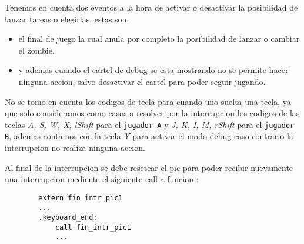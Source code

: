 	Tenemos en cuenta dos eventos a la hora de activar o desactivar la posibilidad de lanzar tareas o elegirlas, estas son: 
	\begin{itemize}
		\item{el final de juego la cual anula por completo la posibilidad de lanzar o cambiar el zombie.}

		\item{y ademas cuando el cartel de debug se esta mostrando no se permite hacer ninguna accion, salvo desactivar el cartel para poder seguir jugando.}
	\end{itemize}

	No se tomo en cuenta los codigos de tecla para cuando uno suelta una tecla, ya que solo consideramos como casos a resolver por la interrupcion los codigos de las teclas \textit{A, S, W, X, lShift} para el \texttt{jugador A} y \textit{J, K, I, M, rShift} para el \texttt{jugador B}, ademas contamos con la tecla \textit{Y} para activar el modo debug caso contrario la interrupcion no realiza ninguna accion.

	Al final de la interrupcion se debe resetear el pic para poder recibir nuevamente una interrupcion mediente el siguiente call a funcion :

	\begin{lstlisting}
		extern fin_intr_pic1
		...
   		.keyboard_end:
    		call fin_intr_pic1
    		...	
	\end{lstlisting}
